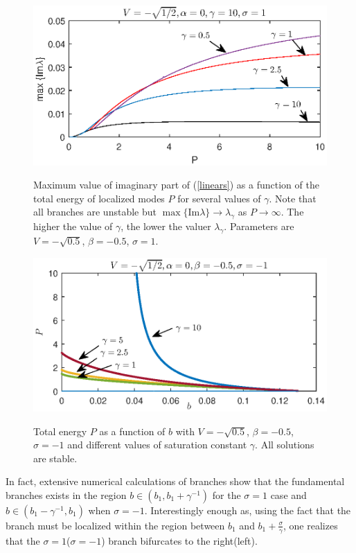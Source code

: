 \documentclass[aps,pre,showpacs,twocolumn]{revtex4}
\begin{document}
\begin{figure}[!htb]
\begin{center}
\scalebox{.65} {\includegraphics{stab_P_lambda_gamma.eps}}
\end{center}
\caption{Maximum value of imaginary part of (\ref{linears}) as a function of the total energy of localized modes $P$ for several values of $\gamma$. Note that all branches are unstable but $\max \{\text{Im}\lambda\}\to \lambda_{\gamma}$ as $P\to \infty$. The higher the value of $\gamma$, the lower the valuer $\lambda_\gamma$. Parameters are $V=-\sqrt{0.5}$, $\beta=-0.5$, $\sigma=1$.}
\label{fig:stab_P_lambda_gamma}
\end{figure}


\begin{figure}[!htb]
\begin{center}
\scalebox{.65} {\includegraphics{branches_V-05_ds-05_c0_sigma-1.eps}}
\end{center}
\caption{Total energy $P$ as a function of $b$  with $V=-\sqrt{0.5}$, $\beta=-0.5$, $\sigma=-1$ and different values of saturation constant $\gamma$. All solutions are stable.}
\label{fig:branches_V-05_ds-05_c0_sigma-1}
\end{figure}
In fact, extensive numerical calculations of branches show that the fundamental branches exists in the region $b\in \left(b_1,b_1+\gamma^{-1}\right)$ for the $\sigma=1$ case and $b\in\left(b_1-\gamma^{-1},b_1\right)$ when $\sigma=-1$. Interestingly enough as, using the fact that the branch must be localized within the region between $b_1$ and $b_1+\frac{\sigma}{\gamma}$, one realizes that the $\sigma=1$($\sigma=-1$) branch bifurcates to the right(left). 
\end{document}
